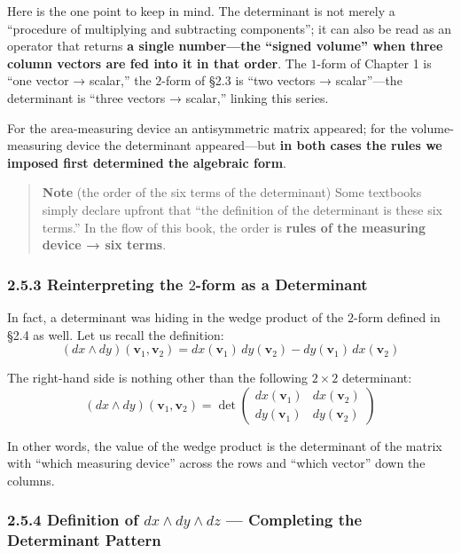 \documentclass[a4paper,12pt,openany]{book}
\begin{document}
Here is the one point to keep in mind. The determinant is not merely a
``procedure of multiplying and subtracting components''; it can also be
read as an operator that returns
\textbf{a single number—the “signed volume” when three column vectors are fed into it in that order}.
The \(1\)-form of Chapter 1 is ``one vector → scalar,'' the \(2\)-form
of §2.3 is ``two vectors → scalar''—the determinant is ``three vectors
→ scalar,'' linking this series.

For the area-measuring device an antisymmetric matrix appeared; for the
volume-measuring device the determinant appeared—but
\textbf{in both cases the rules we imposed first determined the algebraic form}.

\begin{quote}
\textbf{Note} (the order of the six terms of the determinant) Some
textbooks simply declare upfront that ``the definition of the
determinant is these six terms.'' In the flow of this book, the order is
\textbf{rules of the measuring device → six terms}.
\end{quote}

\hypertarget{reinterpreting-the-2-form-as-a-determinant}{%
\subsubsection{\texorpdfstring{2.5.3 Reinterpreting the \(2\)-form as a
Determinant}{2.5.3 Reinterpreting the 2-form as a Determinant}}\label{reinterpreting-the-2-form-as-a-determinant}}

In fact, a determinant was hiding in the wedge product of the \(2\)-form
defined in §2.4 as well. Let us recall the definition:
\[(dx \wedge dy)(\mathbf{v}_1, \mathbf{v}_2) = dx(\mathbf{v}_1)\,dy(\mathbf{v}_2) - dy(\mathbf{v}_1)\,dx(\mathbf{v}_2)\]

The right-hand side is nothing other than the following \(2 \times 2\)
determinant:
\[(dx \wedge dy)(\mathbf{v}_1, \mathbf{v}_2) = \det\begin{pmatrix} dx(\mathbf{v}_1) & dx(\mathbf{v}_2) \\ dy(\mathbf{v}_1) & dy(\mathbf{v}_2) \end{pmatrix}\]

In other words, the value of the wedge product is the determinant of the
matrix with ``which measuring device'' across the rows and ``which
vector'' down the columns.

\hypertarget{definition-of-dx-wedge-dy-wedge-dz-completing-the-determinant-pattern}{%
\subsubsection{\texorpdfstring{2.5.4 Definition of
\(dx \wedge dy \wedge dz\) — Completing the Determinant
Pattern}{2.5.4 Definition of dx \textbackslash wedge dy \textbackslash wedge dz — Completing the Determinant Pattern}}\label{definition-of-dx-wedge-dy-wedge-dz-completing-the-determinant-pattern}}
\end{document}
